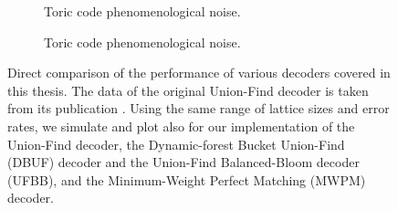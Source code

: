 \begin{figure}[htbp]
  \begin{subfigure}[b]{\textwidth}
    \begin{adjustbox}{Clip=0 1em 0 0}
      
    \end{adjustbox}
    \caption{Toric code phenomenological noise.}
  \end{subfigure}
  \begin{subfigure}[b]{\textwidth}
    \begin{adjustbox}{Clip=0 1em 0 0}
      
    \end{adjustbox}
    \caption{Toric code phenomenological noise.}
  \end{subfigure}
  \caption{Direct comparison of the performance of various decoders covered in this thesis. The data of the original Union-Find decoder is taken from its publication \cite{delfosse2017almost}. Using the same range of lattice sizes and error rates, we simulate and plot also for our implementation of the Union-Find decoder, the Dynamic-forest Bucket Union-Find (DBUF) decoder and the Union-Find Balanced-Bloom decoder (UFBB), and the Minimum-Weight Perfect Matching (MWPM) decoder.}
\end{figure}